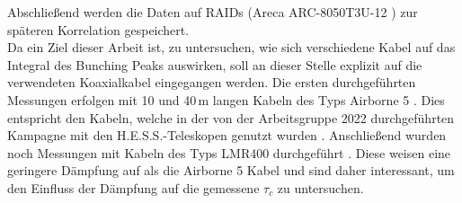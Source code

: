 Abschließend werden die Daten auf RAIDs (Areca ARC-8050T3U-12 \cite{ARC8050T3UThunderboltUSB}) zur späteren Korrelation gespeichert. \\
Da ein Ziel dieser Arbeit ist, zu untersuchen, wie sich verschiedene Kabel auf das Integral des Bunching Peaks auswirken, soll an dieser Stelle explizit auf die verwendeten Koaxialkabel eingegangen werden. 
Die ersten durchgeführten Messungen erfolgen mit 10 und 40\,m langen Kabeln des Typs Airborne 5 \cite{s.r.lAirborne10Coaxial}. 
Dies entspricht den Kabeln, welche in der von der Arbeitsgruppe 2022 durchgeführten Kampagne mit den H.E.S.S.-Teleskopen genutzt wurden \cite{zmijaFirstIntensityInterferometry2023}. 
Anschließend wurden noch Messungen mit Kabeln des Typs LMR400 durchgeführt \cite{LMR400CoaxCable}. 
Diese weisen eine geringere Dämpfung auf als die Airborne 5 Kabel und sind daher interessant, um den Einfluss der Dämpfung auf die gemessene $\tau_c$ zu untersuchen. \\

